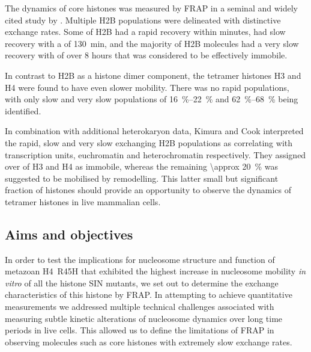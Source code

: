     The dynamics of core histones was measured by FRAP in a seminal
    and widely cited study by \citep{KimuraCook}.  Multiple H2B
    populations were delineated with distinctive exchange rates.  Some
     of H2B had a rapid recovery within minutes, 
    had slow recovery with a \halflife[] of \SI{130}{\minute}, and the
    majority of H2B molecules had a very slow recovery with \halflife[] of
    over 8 hours that was considered to be effectively immobile.

    In contrast to H2B as a histone dimer component, the tetramer
    histones H3 and H4 were found to have even slower mobility.  There
    was no rapid populations, with only slow and very slow populations
    of \SIrange{16}{22}{\percent} and \SIrange{62}{68}{\percent} being
    identified.

    In combination with additional heterokaryon data, Kimura and Cook
    interpreted the rapid, slow and very slow exchanging H2B
    populations as correlating with transcription units, euchromatin
    and heterochromatin respectively.  They assigned over 
    of H3 and H4 as immobile, whereas the remaining
    \SI{\approx 20}{\percent} was suggested to be mobilised by
    remodelling.  This latter small but significant fraction of
    histones should provide an opportunity to observe the dynamics of
    tetramer histones in live mammalian cells.


  \subsection{Aims and objectives}

    In order to test the implications for nucleosome structure and function
    of metazoan H4~R45H that exhibited the highest increase
    in nucleosome mobility \textit{in vitro} of all the histone SIN mutants,
    we set out to determine the exchange characteristics
    of this histone by FRAP.
    In attempting to achieve quantitative measurements
    we addressed multiple technical challenges associated with
    measuring subtle kinetic alterations of nucleosome dynamics
    over long time periods in live cells.
    This allowed us to define the limitations of FRAP in observing molecules
    such as core histones with extremely slow exchange rates.
